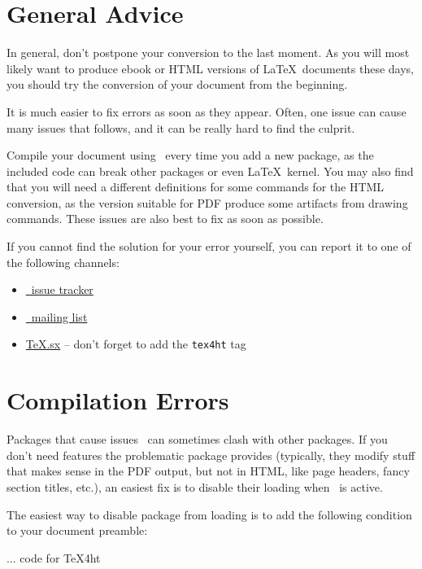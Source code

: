 
\section{General Advice}

In general, don't postpone your conversion to the last moment. As you will 
most likely want to produce ebook or HTML versions of \LaTeX\ documents these days, 
you should try the conversion of your document from the beginning. 

It is much easier to fix errors as soon as they appear. Often, one issue can
cause many issues that follows, and it can be really hard to find the culprit. 

Compile your document using \texfourht\ every time you add
a new package, as the included code can break other packages or even \LaTeX\ kernel. 
You may also find that you will need a different definitions for some commands for the HTML conversion, as the 
version suitable for PDF produce some artifacts from drawing commands. These issues are 
also best to fix as soon as possible.

If you cannot find the solution for your error yourself, you can report it to one of the following 
channels:

\begin{itemize}
  \item \href{https://puszcza.gnu.org.ua/bugs/?group=tex4ht}{\texfourht\ issue tracker} 
  \item \href{https://tug.org/mailman/listinfo/tex4ht}{\texfourht\ mailing list}
  \item \href{https://tex.stackexchange.com/questions/tagged/tex4ht}{TeX.sx} -- don't forget to add the \texttt{tex4ht} tag
\end{itemize}


\section{Compilation Errors}
\label{faq:compilation_errors}


\begin{issue}{Packages that cause issues}
\texfourht\ can sometimes clash with other packages. If you don't need features
the problematic package provides (typically, they modify stuff that makes sense in 
the PDF output, but not in HTML, like page headers, fancy section titles, etc.),
an easiest fix is to disable their loading when \texfourht\ is active. 

The easiest way to disable package from loading is to add the following
condition to your document preamble:

\begin{texsource}
\ifdefined\HCode
... code for TeX4ht
\else
\usepackage{foo}
\fi
\end{texsource}
\end{issue}

